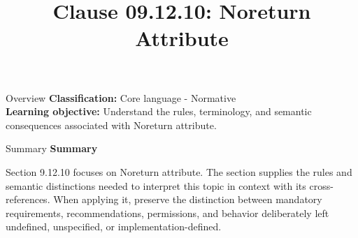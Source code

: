 \documentclass[10pt,letterpaper]{article}
\title{Clause 09.12.10: Noreturn Attribute}
\author{}
\date{}
\begin{document}
\maketitle
\begin{CornellOverviewBox}{Overview}
\textbf{Classification:} Core language - Normative\\[2pt]
\textbf{Learning objective:} Understand the rules, terminology, and semantic consequences associated with Noreturn attribute.
\end{CornellOverviewBox}\begin{CornellSummaryBox}{Summary}
{\sffamily\bfseries\color{Accent} Summary}\par\vspace{3pt}Section 9.12.10 focuses on Noreturn attribute. The section supplies the rules and semantic distinctions needed to interpret this topic in context with its cross-references. When applying it, preserve the distinction between mandatory requirements, recommendations, permissions, and behavior deliberately left undefined, unspecified, or implementation-defined.
\end{CornellSummaryBox}
\end{document}
